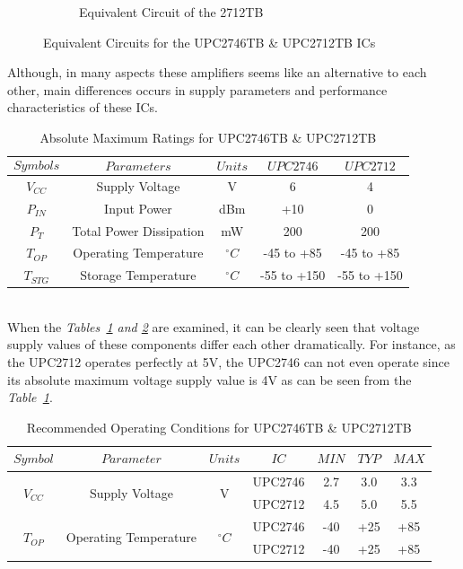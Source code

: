 \begin{figure}[H]
\begin{subfigure}{.5\textwidth}
  		\caption{\label{fig:2712cct}Equivalent Circuit of the 2712TB}
	\end{subfigure}
\caption{\label{fig:274612cct} Equivalent Circuits for the UPC2746TB \& UPC2712TB ICs   }
\end{figure}	


	Although, in many aspects these amplifiers seems like an alternative to each other, main differences occurs in supply parameters and performance characteristics of these ICs.\\
	
\begin{table}[H]
  \centering
 	\caption{Absolute Maximum Ratings for UPC2746TB \& UPC2712TB}
    \begin{tabular}{c|c|c|c|c}
       $$Symbols$$ & $$Parameters$$ & $$Units$$  & $$UPC2746$$  & $$UPC2712$$ \\ \hline
       $V_{CC}$ & Supply Voltage & V & 6 &  4 \\ \hline
       $P_{IN}$ & Input Power & dBm &  +10 &  0 \\ \hline
       $P_T$ & Total Power Dissipation & mW & 200 & 200 \\ \hline
       $T_{OP}$ & Operating Temperature & $^{\circ}C$ & -45 to +85  & -45 to +85 \\ \hline
       $T_{STG}$ & Storage Temperature &  $^{\circ}C$ & -55 to +150 & -55 to +150 
 	\end{tabular}
  
  \label{tab:absmax}
\end{table}\-\\
	
	When the \textit{Tables~\ref{tab:absmax} and \ref{tab:reccomb} } are examined, it can be clearly seen that voltage supply values of these components differ each other dramatically. For instance, as the UPC2712 operates perfectly at 5V, the UPC2746 can not even operate since its absolute maximum voltage supply value is 4V as can be seen from the \textit{Table~\ref{tab:absmax}}.  \\	
	
	
\begin{table}[H]
  \centering	
  	\caption{Recommended Operating Conditions for UPC2746TB \& UPC2712TB}
	\begin{tabular}{c|c|c|c|c|c|c}
       $Symbol$ & $$Parameter$$ & $$Units$$ & $$IC$$ & $$MIN$$ & $$TYP$$ & $$MAX$$ \\ \hline
       \multirow{2}{*}{$V_{CC}$} & \multirow{2}{*}{Supply Voltage} & \multirow{2}{*}{V} & UPC2746 & 2.7 & 3.0 & 3.3  
       \\ \cline{4-7}  & & & UPC2712 & 4.5 & 5.0 &  5.5  \\ \hline
       \multirow{2}{*}{$T_{OP}$} & \multirow{2}{*}{Operating Temperature} & \multirow{2}{*}{$^{\circ}C$} & UPC2746 & -40 & +25 & +85  
       \\ \cline{4-7}  & & & UPC2712 & -40 & +25 & +85 
       \end{tabular}
       
  \label{tab:reccomb}
\end{table}\-\\

